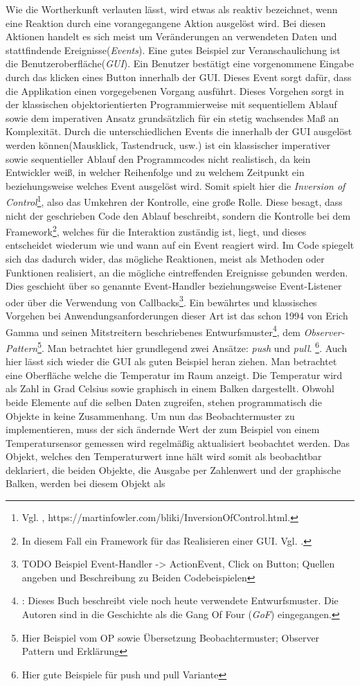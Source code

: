 Wie die Wortherkunft verlauten lässt, wird etwas als reaktiv bezeichnet, wenn eine Reaktion durch eine vorangegangene Aktion ausgelöst wird. Bei diesen Aktionen handelt es sich meist um Veränderungen an verwendeten Daten und stattfindende Ereignisse(\textit{Events}). Eine gutes Beispiel zur Veranschaulichung ist die Benutzeroberfläche(\textit{GUI}). Ein Benutzer bestätigt eine vorgenommene Eingabe durch das klicken eines Button innerhalb der GUI. Dieses Event sorgt dafür, dass die Applikation einen vorgegebenen Vorgang ausführt. Dieses Vorgehen sorgt in der klassischen objektorientierten Programmierweise mit sequentiellem Ablauf sowie dem imperativen Ansatz grundsätzlich für ein stetig wachsendes Maß an Komplexität. Durch die unterschiedlichen Events die innerhalb der GUI ausgelöst werden können(Mausklick, Tastendruck, usw.) ist ein klassischer imperativer sowie sequentieller Ablauf den Programmcodes nicht realistisch, da kein Entwickler weiß, in welcher Reihenfolge und zu welchem Zeitpunkt ein beziehungsweise welches Event ausgelöst wird. Somit spielt hier die \textit{Inversion of Control}\footnote{Vgl. \cite{MartinFowler.2005}, https://martinfowler.com/bliki/InversionOfControl.html.}, also das Umkehren der Kontrolle, eine große Rolle. Diese besagt, dass nicht der geschrieben Code den Ablauf beschreibt, sondern die Kontrolle bei dem Framework\footnote{In diesem Fall ein Framework für das Realisieren einer GUI. Vgl. \cite{wiki.guilist}.}, welches für die Interaktion zuständig ist, liegt, und dieses entscheidet wiederum wie und wann auf ein Event reagiert wird. Im Code spiegelt sich das dadurch wider, das mögliche Reaktionen, meist als Methoden oder Funktionen realisiert, an die mögliche eintreffenden Ereignisse gebunden werden. Dies geschieht über so genannte Event-Handler beziehungsweise Event-Listener oder über die Verwendung von Callbacks\footnote{TODO Beispiel Event-Handler -> ActionEvent, Click on Button; Quellen angeben und Beschreibung zu Beiden Codebeispielen}. Ein bewährtes und klassisches Vorgehen bei Anwendungsanforderungen dieser Art ist das schon 1994 von Erich Gamma und seinen Mitstreitern beschriebenes Entwurfsmuster\footnote{\cite{Gamma.2011}: Dieses Buch beschreibt viele noch heute verwendete Entwurfsmuster. Die Autoren sind in die Geschichte als die Gang Of Four (\textit{GoF}) eingegangen.}, dem \textit{Observer-Pattern}\footnote{Hier Beispiel vom OP sowie Übersetzung Beobachtermuster; Observer Pattern und Erklärung}. Man betrachtet hier grundlegend zwei Ansätze: \textit{push}  und \textit{pull}. \footnote{Hier gute Beispiele für push und pull Variante}. Auch hier lässt sich wieder die GUI als guten Beispiel heran ziehen. Man betrachtet eine Oberfläche welche die Temperatur im Raum anzeigt. Die Temperatur wird als Zahl in Grad Celsius sowie graphisch in einem Balken dargestellt. Obwohl beide Elemente auf die selben Daten zugreifen, stehen programmatisch die Objekte in keine Zusammenhang. Um nun das Beobachtermuster zu implementieren, muss der sich ändernde Wert der zum Beispiel von einem Temperatursensor gemessen wird regelmäßig aktualisiert beobachtet werden. Das Objekt, welches den Temperaturwert inne hält wird somit als beobachtbar deklariert, die beiden Objekte, die Ausgabe per Zahlenwert und der graphische Balken, werden bei diesem Objekt als 